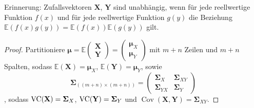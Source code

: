 \documentclass{tstextbook}
\begin{document}
\begin{remark}
	
	Erinnerung: Zufallsvektoren $ \mathbf{X} $, $ \mathbf{Y} $ sind unabhängig, wenn für jede reellwertige Funktion $ f(x) $  und für jede reellwertige Funktion $ g(y) $ die Beziehung $ \mathbb{E}\left(f(x)g(y)\right)=\mathbb{E}\left(f(x)\right) \mathbb{E}\left(g(y)\right)$ gilt.
	
	\end{remark}

\begin{proof}
	
	Partitioniere $ \boldsymbol{\mu} = \mathbb{E} \begin{pmatrix} \mathbf{X} \\ \mathbf{Y} \end{pmatrix} =  \begin{pmatrix} \boldsymbol{\mu}_X \\ \boldsymbol{\mu}_Y \end{pmatrix}$ mit $ m+n $ Zeilen und $ m+n $ Spalten, sodass
	$  \mathbb{E}(\mathbf{X})=\boldsymbol{\mu}_X $,
	$ \mathbb{E}(\mathbf{Y}) = \boldsymbol{\mu}_Y $, sowie
	\[ \boldsymbol{\Sigma}_{((m+n)\times (m+n))} = \begin{pmatrix}
			\boldsymbol{\Sigma}_X & \boldsymbol{\Sigma}_{XY} \\ \boldsymbol{\Sigma}_{YX} & \boldsymbol{\Sigma}_Y
		\end{pmatrix} \], sodass 
	$ \operatorname{VC}(\mathbf{X})=\boldsymbol{\Sigma}_X $, $\operatorname{VC}(\mathbf{Y})=\boldsymbol{\Sigma}_Y $ und $ \operatorname{Cov}(\mathbf{X},\mathbf{Y}) = \boldsymbol{\Sigma}_{XY}. $
	

\end{proof}
\end{document}
